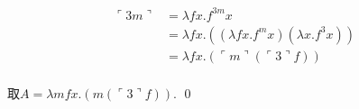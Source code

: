 \begin{pf} \rm \;
$$
    \begin{aligned}
\ulcorner 3m\urcorner 
&= \lambda f x. f^{3m} x \\
&= \lambda f x. ((\lambda fx. f^m x) (\lambda x. f^3 x)) \\
&= \lambda f x. (\ulcorner m\urcorner (\ulcorner 3\urcorner f))  \\       
\end{aligned}
$$

取$A=\lambda mfx. (m (\ulcorner 3\urcorner f))$.
    \qed 
\end{pf}